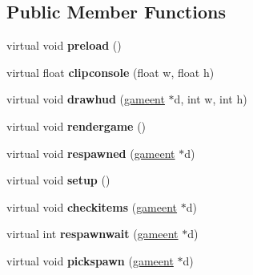 \subsection*{Public Member Functions}
\begin{DoxyCompactItemize}
\item 
\mbox{\label{structgame_1_1clientmode_a1beb9f371902517ea005c1ba3e3f27c2}} 
virtual void {\bfseries preload} ()
\item 
\mbox{\label{structgame_1_1clientmode_a0af55e985aafec5574fb8a5d85ccad7b}} 
virtual float {\bfseries clipconsole} (float w, float h)
\item 
\mbox{\label{structgame_1_1clientmode_a3853a921a65e26d3d5191dbb6dcbaf27}} 
virtual void {\bfseries drawhud} (\hyperlink{structgameent}{gameent} $\ast$d, int w, int h)
\item 
\mbox{\label{structgame_1_1clientmode_a78c5605c83809da8eff961ff8e8c276f}} 
virtual void {\bfseries rendergame} ()
\item 
\mbox{\label{structgame_1_1clientmode_a694580c6c480d4c365f4654c699fb305}} 
virtual void {\bfseries respawned} (\hyperlink{structgameent}{gameent} $\ast$d)
\item 
\mbox{\label{structgame_1_1clientmode_a44fc841a183a5beb3838fc8cb62f2144}} 
virtual void {\bfseries setup} ()
\item 
\mbox{\label{structgame_1_1clientmode_a0fb8b920d580627cc9f7c91aa612a0be}} 
virtual void {\bfseries checkitems} (\hyperlink{structgameent}{gameent} $\ast$d)
\item 
\mbox{\label{structgame_1_1clientmode_ab79774790886c3e75b2611240a482a25}} 
virtual int {\bfseries respawnwait} (\hyperlink{structgameent}{gameent} $\ast$d)
\item 
\mbox{\label{structgame_1_1clientmode_a615c81ca9082838a15d1d57716c1f056}} 
virtual void {\bfseries pickspawn} (\hyperlink{structgameent}{gameent} $\ast$d)
\item 

\end{DoxyCompactItemize}
